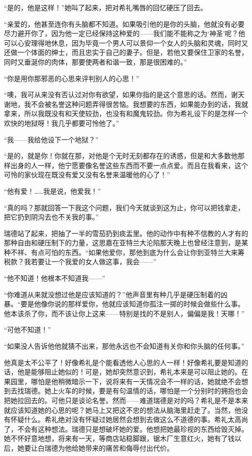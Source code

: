 \par “是的，他是这样！”她叫了起来，把对希礼嘴唇的回忆硬压了回去。
\par “亲爱的，他甚至连你有头脑都不知道。如果吸引他的是你的头脑，他就没有必要尽力避开你了，因为他一定已经保持这种爱的——我们能不能称之为‘神圣’呢？他可以心安理得地休息，因为毕竟一个男人可以景仰一个女人的头脑和灵魂，同时又还做一个体面的绅士，而且忠实于自己的妻子。但是，若他又要保住卫家的名誉，同时又垂涎你的肉体，那要使两者和谐一致，那是很困难的。”
\par “你是用你那邪恶的心思来评判别人的心思！”
\par “噢，我可从来没有否认过对你有欲望，如果你指的是这个意思的话。然而，谢天谢地，我不会被名誉这种问题弄得很苦恼。我想要的东西，如果能办到的话，我就拿来，所以我既没有和天使较劲，也没有和魔鬼较劲。你为希礼设下的是怎样一个欢快的地狱呀！我几乎都要可怜他了。”
\par “我——我给他设下一个地狱？”
\par “是的，就是你！你就在那，对他是个无时无刻都存在的诱惑，但是和大多数他那样出身的人一样，他宁愿要像名誉这些东西而不要一点点爱。而且在我看来，这个可怜的家伙现在既没有爱又没有名誉来温暖他的心了！”
\par “他有爱！……我是说，他爱我！”
\par “真的吗？那就回答一下我这个问题，我们今天就谈到这为止，你可以把钱拿走，把它扔到阴沟去也不关我的事。”
\par 瑞德站了起来，把抽了一半的雪茄扔到痰盂里。他的动作中有种不信教的人才有的那种自由和硬压制下的力量，这思嘉在亚特兰大沦陷那天晚上也曾经注意到，是某种不祥、有点可怕的东西。“如果他爱你，那他到底为什么会让你到亚特兰大来筹税款？我若要让一个我爱的女人做这事，我会——”
\par “他不知道！他根本不知道我——”
\par “你难道从来就没想过他是应该知道的？”他声音里有种几乎是硬压制着的凶暴。“要是他像你说的那样爱你，他就应该知道你孤注一掷的时候会做些什么事。他本该杀了你，而不该让你上这来——特别是找的不是别人，偏偏是我！天哪！”
\par “可他不知道！”
\par “如果没人告诉他他就猜不出来，那他永远也不会知道有关你和你头脑的任何事。”
\par 他真是太不公平了！好像希礼是个能看透他人心思的人一样！好像希礼要是知道的话，他是能够阻止她似的！可是，她却突然意识到，希礼本来是可以阻止她的。在果园里，哪怕是他稍微暗示一下，说将来有一天情况会不一样的话，她就绝不会想到去找瑞德。她上火车的时候，要是有句温情的话，哪怕是一个分别时的拥抱也会把她拉回去的。可他只是谈论名誉。然而——难道瑞德是对的吗？希礼是不是本来就应该知道她的心思的呢？她马上又把这不忠的想法从脑海里赶走了。当然，他没有怀疑什么。希礼绝对没有怀疑过她居然会想到去做这么不道德的事。希礼太高尚了，不会有这种想法。瑞德只是想破坏她的爱。他想把她最珍视的东西给毁灭掉。她不怀好意地想，将来有一天，等商店站稳脚跟，锯木厂生意红火，她有了钱以后，她要让白瑞德为他给她带来的痛苦和侮辱付出代价。
